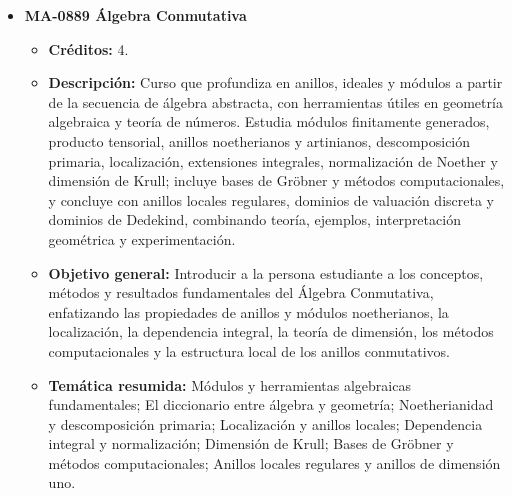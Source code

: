 \begin{itemize}[leftmargin=1.3em, itemsep=10pt, topsep=4pt, label={\color{Azul-UCR}$\blacksquare$}]
\item {\color{Azul-UCR}\textbf{MA-0889 Álgebra Conmutativa}}\par\nopagebreak\smallskip
\begin{itemize}[leftmargin=1.1em, itemsep=3pt, topsep=2pt, parsep=2pt, label={\textendash}]
\item \textbf{Créditos:} 4.
\item \textbf{Descripción:} Curso que profundiza en anillos, ideales y módulos a partir de la secuencia de álgebra abstracta, con herramientas útiles en geometría algebraica y teoría de números. Estudia módulos finitamente generados, producto tensorial, anillos noetherianos y artinianos, descomposición primaria, localización, extensiones integrales, normalización de Noether y dimensión de Krull; incluye bases de Gröbner y métodos computacionales, y concluye con anillos locales regulares, dominios de valuación discreta y dominios de Dedekind, combinando teoría, ejemplos, interpretación geométrica y experimentación.
\item \textbf{Objetivo general:} Introducir a la persona estudiante a los conceptos, métodos y resultados fundamentales del Álgebra Conmutativa, enfatizando las propiedades de anillos y módulos noetherianos, la localización, la dependencia integral, la teoría de dimensión, los métodos computacionales y la estructura local de los anillos conmutativos.
\item \textbf{Temática resumida:} Módulos y herramientas algebraicas fundamentales; El diccionario entre álgebra y geometría; Noetherianidad y descomposición primaria; Localización y anillos locales; Dependencia integral y normalización; Dimensión de Krull; Bases de Gröbner y métodos computacionales; Anillos locales regulares y anillos de dimensión uno.
\end{itemize}


\end{itemize}
